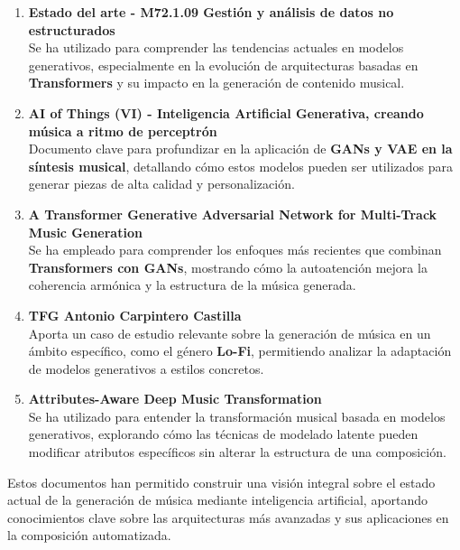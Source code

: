 \begin{enumerate}
    \item \textbf{Estado del arte - M72.1.09 Gestión y análisis de datos no estructurados} \\ 
    Se ha utilizado para comprender las tendencias actuales en modelos generativos, especialmente en la evolución de arquitecturas basadas en \textbf{Transformers} y su impacto en la generación de contenido musical.

    \item \textbf{AI of Things (VI) - Inteligencia Artificial Generativa, creando música a ritmo de perceptrón} \\ 
    Documento clave para profundizar en la aplicación de \textbf{GANs y VAE en la síntesis musical}, detallando cómo estos modelos pueden ser utilizados para generar piezas de alta calidad y personalización.

    \item \textbf{A Transformer Generative Adversarial Network for Multi-Track Music Generation} \\ 
    Se ha empleado para comprender los enfoques más recientes que combinan \textbf{Transformers con GANs}, mostrando cómo la autoatención mejora la coherencia armónica y la estructura de la música generada.

    \item \textbf{TFG Antonio Carpintero Castilla} \\ 
    Aporta un caso de estudio relevante sobre la generación de música en un ámbito específico, como el género \textbf{Lo-Fi}, permitiendo analizar la adaptación de modelos generativos a estilos concretos.

    \item \textbf{Attributes-Aware Deep Music Transformation} \\ 
    Se ha utilizado para entender la transformación musical basada en modelos generativos, explorando cómo las técnicas de modelado latente pueden modificar atributos específicos sin alterar la estructura de una composición.
\end{enumerate}

Estos documentos han permitido construir una visión integral sobre el estado actual de la generación de música mediante inteligencia artificial, aportando conocimientos clave sobre las arquitecturas más avanzadas y sus aplicaciones en la composición automatizada.

\renewcommand{\arraystretch}{1.3} %

